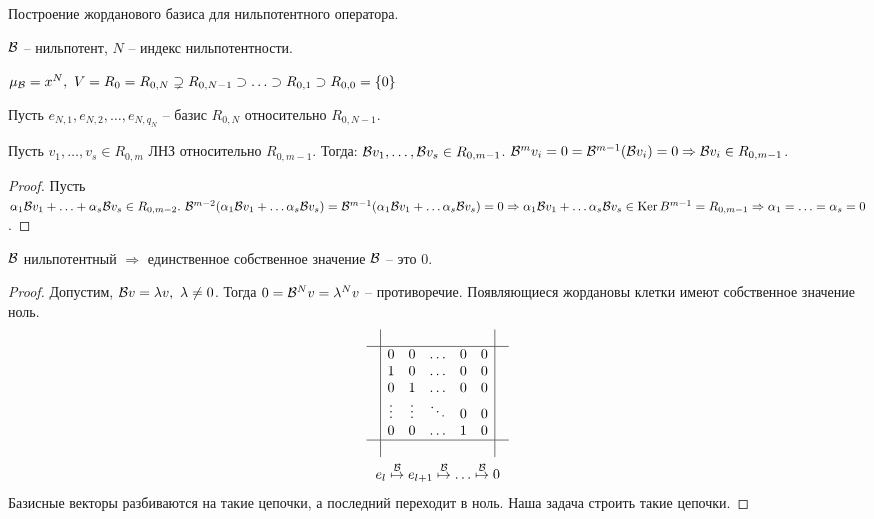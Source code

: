 \documentclass[main]{subfiles}
\begin{document}
Построение жорданового базиса для нильпотентного оператора.

$\mathcal{B}$ -- нильпотент, $N$ -- индекс нильпотентности.

$\mu_{\mathcal{B}} = x^N, \ V = R_0 = R_{0, N} \supsetneq R_{0, N-1} \supset \ldots \supset R_{0, 1} \supset R_{0, 0} = \{0\}$

Пусть $e_{N, 1}, e_{N,2}, \ldots, e_{N, q_N}$ -- базис $R_{0, N}$ относительно $R_{0, N-1}$.

\begin{lemma}
  Пусть $v_1, \ldots, v_s \in R_{0, m}$ ЛНЗ относительно $R_{0, m-1}$.
  Тогда: $\mathcal{B} v_1, \ldots, \mathcal{B} v_s \in R_{0, m-1}$. $\mathcal{B}^m v_i = 0 = \mathcal{B}^{m-1}(\mathcal{B} v_i) = 0 \Rightarrow \mathcal{B} v_i \in R_{0, m-1}$.
\end{lemma}

\begin{proof}
  Пусть $\alpha_1 \mathcal{B} v_1 + \ldots + \alpha_s \mathcal{B} v_s \in R_{0, m-2}. \ \mathcal{B}^{m-2}(\alpha_1 \mathcal{B} v_1 + \ldots \alpha_s \mathcal{B} v_s) =
    \mathcal{B}^{m-1}(\alpha_1 \mathcal{B} v_1 + \ldots \alpha_s \mathcal{B} v_s) = 0 \Rightarrow \alpha_1 \mathcal{B} v_1 + \ldots \alpha_s \mathcal{B} v_s \in \operatorname{Ker} B^{m-1} = R_{0, m-1}
    \Rightarrow \alpha_1 = \ldots = \alpha_s = 0$.
\end{proof}

\begin{remark}
  $\mathcal{B}$  нильпотентный $\Rightarrow$ единственное собственное значение $\mathcal{B}$ -- это 0.
\end{remark}

\begin{proof}
  Допустим, $\mathcal{B} v = \lambda v, \ \lambda\neq 0$. Тогда $0 = \mathcal{B}^N v = \lambda^N v$  -- противоречие. Появляющиеся жордановы клетки имеют собственное значение ноль.
  \begin{gather*}
    \begin{array}{c|c|c}
       &                                     & \\
      \hline
       & \begin{matrix}
           0      & 0      & \ldots & 0 & 0 \\
           1      & 0      & \ldots & 0 & 0 \\
           0      & 1      & \ldots & 0 & 0 \\
           \vdots & \vdots & \ddots & 0 & 0 \\
           0      & 0      & \ldots & 1 & 0 \\
         \end{matrix} &      \\
      \hline
       &                                     & \\
    \end{array} \\
    e_l \stackrel{\mathcal{B}}{\mapsto} e_{l+1} \stackrel{\mathcal{B}}{\mapsto} \ldots \stackrel{\mathcal{B}}{\mapsto} 0
  \end{gather*}
  Базисные векторы разбиваются на такие цепочки, а последний переходит в ноль. Наша задача строить такие цепочки.
\end{proof}
\end{document}
